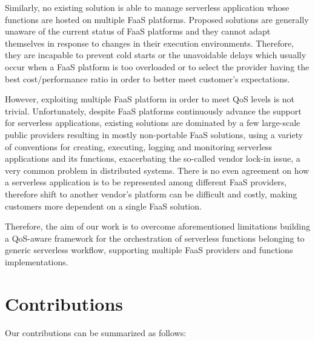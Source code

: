 \documentclass[12pt,a4paper]{report}
\begin{document}
Similarly, no existing solution is able to manage serverless application whose functions are hosted on multiple FaaS platforms. Proposed solutions are generally unaware of the current status of FaaS platforms and they cannot adapt themselves in response to changes in their execution environments. Therefore, they are incapable to prevent cold starts or the unavoidable delays which usually occur when a FaaS platform is too overloaded or to select the provider having the best cost/performance ratio in order to better meet customer's expectations.

However, exploiting multiple FaaS platform in order to meet QoS levels is not trivial. Unfortunately, despite FaaS platforms continuously advance the support for serverless applications, existing solutions are dominated by a few large-scale public providers resulting in mostly non-portable FaaS solutions, using a variety of conventions for creating, executing, logging and monitoring serverless applications and its functions, exacerbating the so-called vendor lock-in issue, a very common problem in distributed systems. There is no even agreement on how a serverless application is to be represented among different FaaS providers, therefore shift to another vendor's platform can be difficult and costly, making customers more dependent on a single FaaS solution.

Therefore, the aim of our work is to overcome aforementioned limitations building a QoS-aware framework for the orchestration of serverless functions belonging to generic serverless workflow, supporting multiple FaaS providers and functions implementations.

\section{Contributions}

Our contributions can be summarized as follows:
\end{document}
